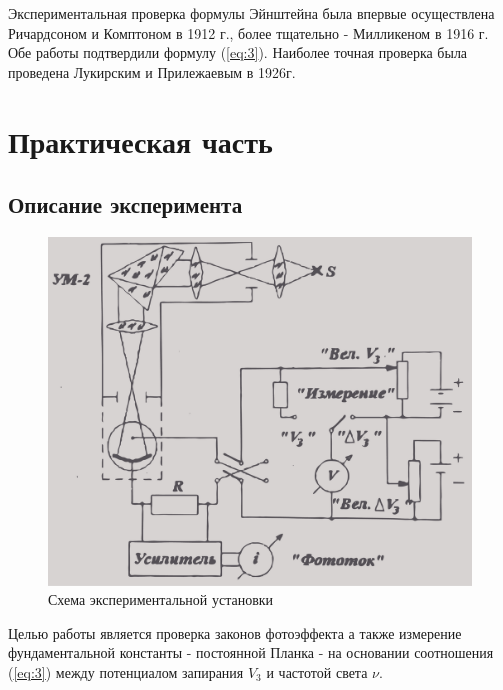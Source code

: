 Экспериментальная проверка формулы Эйнштейна была впервые осуществлена Ричардсоном и Комптоном в 1912 г., более тщательно - Милликеном в 1916 г. Обе работы подтвердили формулу (\ref{eq:3}). Наиболее точная проверка была проведена Лукирским и Прилежаевым в 1926г.

\section{Практическая часть}
\subsection{Описание эксперимента}
\begin{figure}[h!]
	\centering
	\includegraphics[width=\linewidth]{fig/fig2}
	\caption{Схема экспериментальной установки}
	\label{fig:2}
\end{figure}

Целью работы является проверка законов фотоэффекта а также измерение фундаментальной константы - постоянной Планка - на основании соотношения (\ref{eq:3}) между потенциалом запирания $V_{3}$ и частотой света $\nu$.


